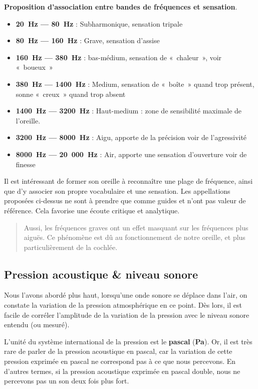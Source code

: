 \documentclass[
  letterpaper,
  DIV=11,
  numbers=noendperiod]{scrreprt}
\providecommand{\tightlist}{%
  \setlength{\itemsep}{0pt}\setlength{\parskip}{0pt}}\usepackage{longtable,booktabs,array}
\begin{document}
\textbf{Proposition d'association entre bandes de fréquences et
sensation}.

\begin{itemize}
\tightlist
\item
  \textbf{20~Hz --- 80~Hz} : Subharmonique, sensation tripale
\item
  \textbf{80~Hz --- 160~Hz} : Grave, sensation d'assise
\item
  \textbf{160~Hz --- 380~Hz} : bas-médium, sensation de «~chaleur~»,
  voir «~boueux~»
\item
  \textbf{380~Hz --- 1400~Hz} : Medium, sensation de «~boîte~» quand
  trop présent, sonne «~creux~» quand trop absent
\item
  \textbf{1400~Hz --- 3200~Hz} : Haut-medium : zone de sensibilité
  maximale de l'oreille.
\item
  \textbf{3200~Hz --- 8000~Hz} : Aigu, apporte de la précision voir de
  l'agressivité
\item
  \textbf{8000~Hz --- 20~000~Hz} : Air, apporte une sensation
  d'ouverture voir de finesse
\end{itemize}

Il est intéressant de former son oreille à reconnaître une plage de
fréquence, ainsi que d'y associer son propre vocabulaire et une
sensation. Les appellations proposées ci-dessus ne sont à prendre que
comme guides et n'ont pas valeur de référence. Cela favorise une écoute
critique et analytique.

\begin{quote}
Aussi, les fréquences graves ont un effet masquant sur les fréquences
plus aiguës. Ce phénomène est dû au fonctionnement de notre oreille, et
plus particulièrement de la cochlée.
\end{quote}

\hypertarget{pression-acoustique-niveau-sonore}{%
\subsection{Pression acoustique \& niveau
sonore}\label{pression-acoustique-niveau-sonore}}

Nous l'avons abordé plus haut, lorsqu'une onde sonore se déplace dans
l'air, on constate la variation de la pression atmosphérique en ce
point. Dès lors, il est facile de corréler l'amplitude de la variation
de la pression avec le niveau sonore entendu (ou mesuré).

L'unité du système international de la pression est le \textbf{pascal}
(\textbf{Pa}). Or, il est très rare de parler de la pression acoustique
en pascal, car la variation de cette pression exprimée en pascal ne
correspond pas à ce que nous percevons. En d'autres termes, si la
pression acoustique exprimée en pascal double, nous ne percevons pas un
son deux fois plus fort.
\end{document}
